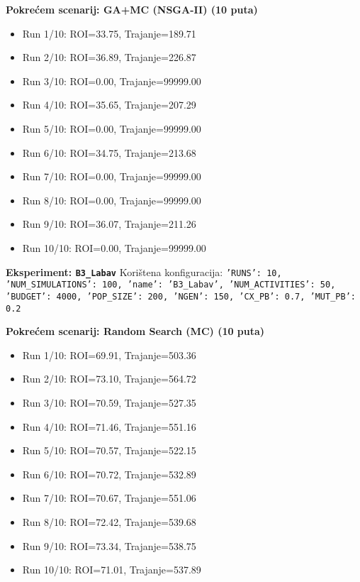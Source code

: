 \textbf{Pokrećem scenarij: GA+MC (NSGA-II) (10 puta)}
\begin{itemize}
    \item Run 1/10: ROI=33.75, Trajanje=189.71
    \item Run 2/10: ROI=36.89, Trajanje=226.87
    \item Run 3/10: ROI=0.00, Trajanje=99999.00
    \item Run 4/10: ROI=35.65, Trajanje=207.29
    \item Run 5/10: ROI=0.00, Trajanje=99999.00
    \item Run 6/10: ROI=34.75, Trajanje=213.68
    \item Run 7/10: ROI=0.00, Trajanje=99999.00
    \item Run 8/10: ROI=0.00, Trajanje=99999.00
    \item Run 9/10: ROI=36.07, Trajanje=211.26
    \item Run 10/10: ROI=0.00, Trajanje=99999.00
\end{itemize}

\textbf{Eksperiment: \texttt{B3\_Labav}}
Korištena konfiguracija: \texttt{'RUNS': 10, 'NUM\_SIMULATIONS': 100, 'name': 'B3\_Labav', 'NUM\_ACTIVITIES': 50, 'BUDGET': 4000, 'POP\_SIZE': 200, 'NGEN': 150, 'CX\_PB': 0.7, 'MUT\_PB': 0.2}

\textbf{Pokrećem scenarij: Random Search (MC) (10 puta)}
\begin{itemize}
    \item Run 1/10: ROI=69.91, Trajanje=503.36
    \item Run 2/10: ROI=73.10, Trajanje=564.72
    \item Run 3/10: ROI=70.59, Trajanje=527.35
    \item Run 4/10: ROI=71.46, Trajanje=551.16
    \item Run 5/10: ROI=70.57, Trajanje=522.15
    \item Run 6/10: ROI=70.72, Trajanje=532.89
    \item Run 7/10: ROI=70.67, Trajanje=551.06
    \item Run 8/10: ROI=72.42, Trajanje=539.68
    \item Run 9/10: ROI=73.34, Trajanje=538.75
    \item Run 10/10: ROI=71.01, Trajanje=537.89
\end{itemize}

